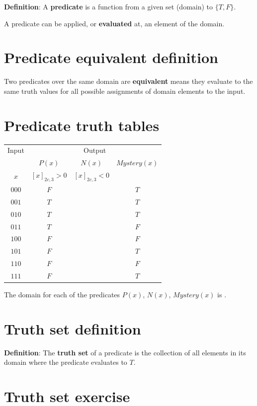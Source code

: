 \documentclass[12pt, oneside]{article}
\begin{document}
{\bf  Definition}: A  {\bf predicate}  is  a function from a given set (domain) to $\{T,F\}$.

A predicate can be applied, or {\bf evaluated} at, an element of the domain. \vfill
\section*{Predicate equivalent definition}


Two predicates over the same domain are {\bf equivalent} means they evaluate to
the same truth values for all possible assignments of domain elements to the
input. \vfill
\section*{Predicate truth tables}


\begin{center}
    \begin{tabular}{c||c|c|c}
    Input & \multicolumn{3}{c}{Output} \\
    &$P(x)$ & $N(x)$ & $Mystery(x)$\\
    $x$ & $[x]_{2c,3} > 0$ & $[x]_{2c,3} < 0$& \\
    \hline
    $000$  & $F$ & & $T$\\
    $001$  & $T$ & & $T$\\
    $010$  & $T$ & & $T$\\
    $011$  & $T$ & & $F$\\
    $100$  & $F$ & & $F$\\
    $101$  & $F$ & & $T$\\
    $110$  & $F$ & & $F$\\
    $111$  & $F$ & & $T$\\
    \end{tabular}
    \end{center}
    
    The domain for each of the predicates $P(x)$, $N(x)$, $Mystery(x)$ is
    \underline{}. \vfill
\section*{Truth set definition}


{\bf Definition}: The {\bf truth  set} of a  predicate is the collection of all elements in its
domain where the predicate evaluates to $T$. \vfill
\section*{Truth set exercise}
\end{document}
